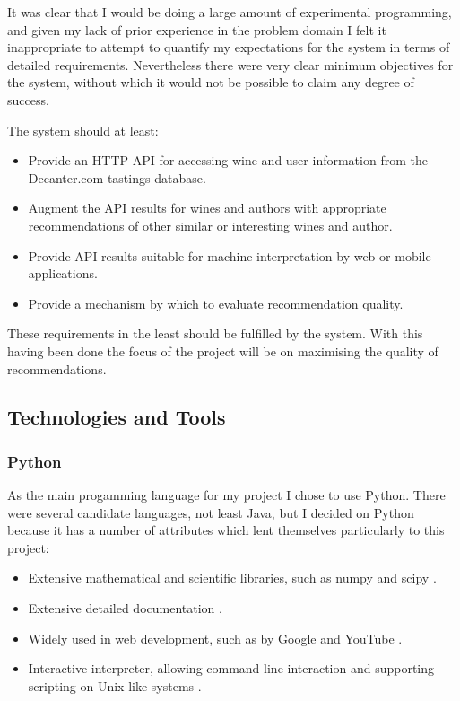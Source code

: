 It was clear that I would be doing a large amount of experimental programming, and given my lack of prior experience in the problem domain I felt it inappropriate to attempt to quantify my expectations for the system in terms of detailed requirements. Nevertheless there were very clear minimum objectives for the system, without which it would not be possible to claim any degree of success.

The system should at least:

\begin{itemize}
    \item Provide an HTTP API for accessing wine and user information from the Decanter.com tastings database.
    \item Augment the API results for wines and authors with appropriate recommendations of other similar or interesting wines and author.
    \item Provide API results suitable for machine interpretation by web or mobile applications.
    \item Provide a mechanism by which to evaluate recommendation quality.
\end{itemize}

These requirements in the least should be fulfilled by the system. With this having been done the focus of the project will be on maximising the quality of recommendations.

\subsection{Technologies and Tools}

\subsubsection{Python}

As the main progamming language for my project I chose to use Python. There were several candidate languages, not least Java, but I decided on Python because it has a number of attributes which lent themselves particularly to this project:

\begin{itemize}
    \item Extensive mathematical and scientific libraries, such as numpy \cite{Numpy} and scipy \cite{Scipy}.
    \item Extensive detailed documentation \cite{PythonDocs}.
    \item Widely used in web development, such as by Google and YouTube \cite{PythonQuotes}.
    \item Interactive interpreter, allowing command line interaction and supporting scripting on Unix-like systems \cite{PythonInterpreter}.
\end{itemize}


